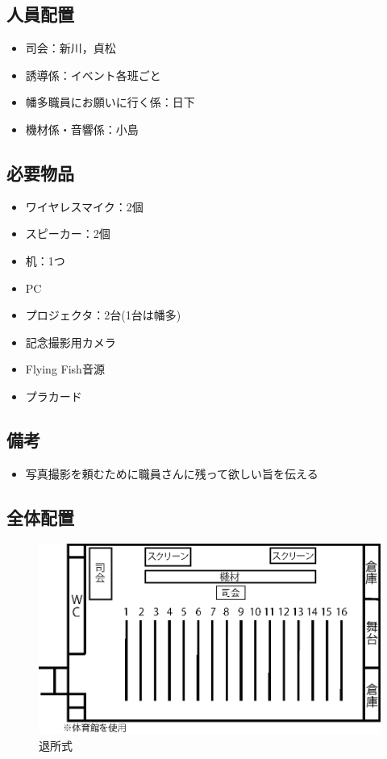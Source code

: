 \subsection{人員配置}
\begin{itemize}
\item 司会：新川，貞松
\item 誘導係：イベント各班ごと
\item 幡多職員にお願いに行く係：日下
\item 機材係・音響係：小島
\end{itemize}


\subsection{必要物品}
\begin{itemize}
\item ワイヤレスマイク：2個
\item スピーカー：2個
\item 机：1つ
\item PC
\item プロジェクタ：2台(1台は幡多)
\item 記念撮影用カメラ
\item Flying Fish音源
\item プラカード
\end{itemize}
\subsection{備考}
\begin{itemize}
\item 写真撮影を頼むために職員さんに残って欲しい旨を伝える
\end{itemize}

\subsection{全体配置}
\begin{figure}[htbp]
  \begin{center}
  \includegraphics[width = 15cm]{./24/hyousyou.eps}
  \caption{退所式}
  \end{center}
\end{figure}

%
